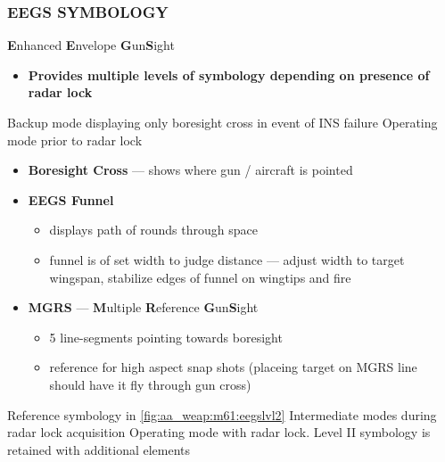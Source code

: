 \subsubsection{EEGS SYMBOLOGY}
\label{subsec:m61:eegssymb}
\begin{tcoloritemize}
    \blueitem[EEGS] 
    \textbf{E}nhanced \textbf{E}nvelope \textbf{G}un\textbf{S}ight

    \begin{itemize}
        \item \textbf{Provides multiple levels of symbology depending on presence of radar lock}
    \end{itemize}
    \blueitem[Level I] Backup mode displaying only boresight cross in event of INS failure
    \blueitem[Level II]
    Operating mode prior to radar lock

    \begin{itemize}
        \item \textbf{Boresight Cross} --- shows where gun / aircraft is pointed
        \item \textbf{EEGS Funnel}
        \begin{itemize}
            \item displays path of rounds through space
            \item funnel is of set width to judge distance --- adjust width to target wingspan, stabilize edges of funnel on wingtips and fire
        \end{itemize}
        \item \textbf{MGRS} --- \textbf{M}ultiple \textbf{R}eference \textbf{G}un\textbf{S}ight
        \begin{itemize}
            \item 5 line-segments pointing towards boresight
            \item reference for high aspect snap shots (placeing target on MGRS line should have it fly through gun cross)
        \end{itemize}
    \end{itemize}
    
    Reference symbology in \cref{fig:aa_weap:m61:eegslvl2}
     Intermediate modes during radar lock acquisition
    \blueitem[Level V]
    Operating mode with radar lock. Level II symbology is retained with additional elements
    

\end{tcoloritemize}
